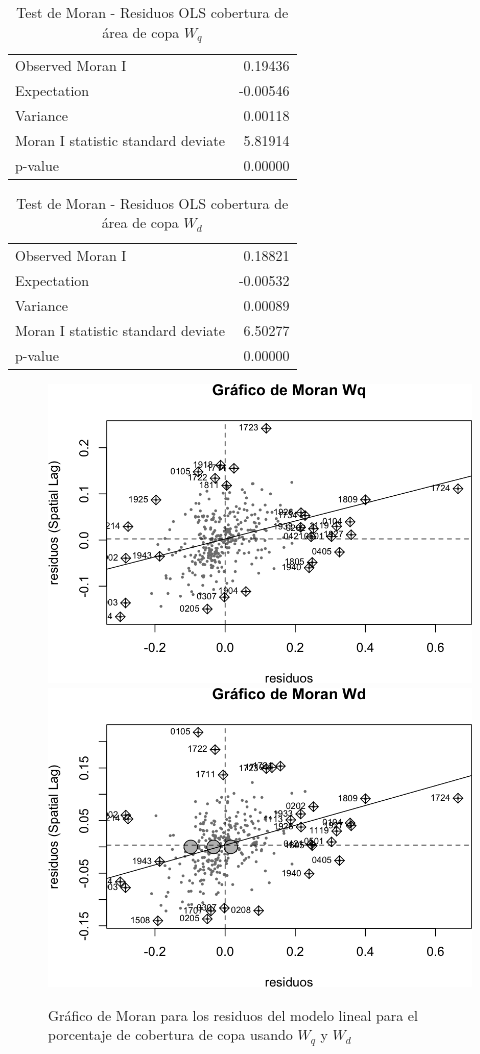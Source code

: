 \documentclass[12pt,]{book}
\begin{document}
\begin{table}

\caption{\label{tab:moran-rescopaap-wq}Test de Moran - Residuos OLS cobertura de área de copa $W_q$}
\centering
\begin{tabular}[t]{lr}
\toprule
  &  \\
\midrule
Observed Moran I & 0.19436\\
Expectation & -0.00546\\
Variance & 0.00118\\
Moran I statistic standard deviate & 5.81914\\
p-value & 0.00000\\
\bottomrule
\end{tabular}
\end{table}

\begin{table}

\caption{\label{tab:moran-rescopaap-wd}Test de Moran - Residuos OLS cobertura de área de copa $W_d$}
\centering
\begin{tabular}[t]{lr}
\toprule
  &  \\
\midrule
Observed Moran I & 0.18821\\
Expectation & -0.00532\\
Variance & 0.00089\\
Moran I statistic standard deviate & 6.50277\\
p-value & 0.00000\\
\bottomrule
\end{tabular}
\end{table}

\begin{figure}
\includegraphics[width=0.49\linewidth]{tesis-unigis_files/figure-latex/moranplot-rescopaap-w-1} \includegraphics[width=0.49\linewidth]{tesis-unigis_files/figure-latex/moranplot-rescopaap-w-2} \caption{Gráfico de Moran para los residuos del modelo lineal para el porcentaje de cobertura de copa usando $W_{q}$ y $W_{d}$}\label{fig:moranplot-rescopaap-w}
\end{figure}
\end{document}
